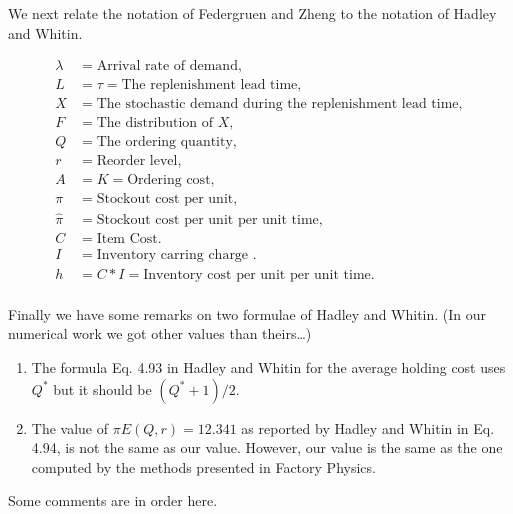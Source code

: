 \documentclass{article}
\newcommand{\1}[1]{\mathbb{1}_{#1}}
\begin{document}
We next relate the notation of Federgruen and Zheng to the
notation of Hadley and Whitin.

\begin{align*}
     \lambda &= \text{Arrival rate of demand}, \\
     L &= \tau = \text{The replenishment lead time}, \\
     X &= \text{The stochastic demand during the replenishment lead time}, \\
     F &= \text{The distribution of } X,\\
     Q &= \text{The ordering quantity}, \\
     r &= \text{Reorder level}, \\
     A & = K = \text{Ordering cost},\\
     \pi & = \text{Stockout cost per unit},\\
     \hat \pi & = \text{Stockout cost per unit per unit time},\\
     C &= \text{Item Cost}. \\
     I &= \text{Inventory carring charge }. \\
     h &= C*I = \text{Inventory cost per unit per unit time}. \\
\end{align*}


Finally we have some remarks on two formulae of Hadley and Whitin. (In
our numerical work we got other values than theirs\ldots)
\begin{enumerate}
\item The formula Eq. 4.93 in Hadley and Whitin for the average
  holding cost uses $Q^*$ but it should be $(Q^*+1)/2$. 
\item The value of $\pi E(Q,r) = 12.341$ as reported by Hadley and
  Whitin in Eq. 4.94, is not the same as our value. However, our value
  is the same as the one computed by the methods presented in Factory
  Physics.
\end{enumerate}

Some comments are in order here.
\end{document}
